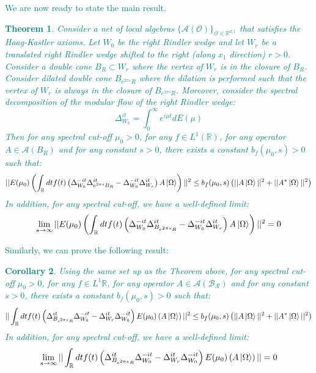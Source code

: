 \documentclass[a4paper,11pt]{article}
\newtheorem{theorem}{Theorem}
\newtheorem{corollary}[theorem]{Corollary}
\theoremstyle{definition}
\newcommand{\lb}{\left(}
\newcommand{\rb}{\right)}
\newcommand{\YC}[1]{\textcolor{teal}{#1}}
\begin{document}
\YC{
We are now ready to state the main result.
\begin{theorem}\label{theorem:mainresult}
    Consider a net of local algebras $\{\mathcal{A}(\mathcal{O})\}_{\mathcal{O}\in\mathbb{R}^{d,1}}$ that satisfies the Haag-Kastler axioms. Let $W_0$ be the right Rindler wedge and let $W_r$ be a translated right Rindler wedge shifted to the right (along $x_1$ direction) $r > 0$. Consider a double cone $B_{R}\subset W_r$ where the vertex of $W_r$ is in the closure of $B_R$. Consider dilated double cone $B_{e^{2\pi s}R}$ where the dilation is performed such that the vertex of $W_r$ is always in the closure of $B_{e^{2\pi s} R}$. Moreover, consider the spectral decomposition of the modular flow of the right Rindler wedge:
    \begin{equation}
        \Delta_{W_0}^{it} = \int_0^\infty e^{i\mu t} dE(\mu)
    \end{equation}
    Then for any spectral cut-off $\mu_0 > 0$, for any $f\in L^1(\mathbb{R})$, for any operator $A\in \mathcal{A}(B_R)$ and for any constant $s > 0$, there exists a constant $b_f(\mu_0, s) > 0$ such that:
    \begin{equation}
        ||E(\mu_0)\lb\int_\mathbb{R} dtf(t)\lb\Delta_{W_0}^{-it}\Delta_{e^{2\pi s}B_R}^{it} - \Delta_{W_0}^{-it}\Delta_{W_r}^{it}\rb A\ket{\Omega}\rb||^2 \leq b_f(\mu_0, s)\lb||A\ket{\Omega}||^2 + ||A^*\ket{\Omega}||^2\rb
    \end{equation}
    In addition, for any spectral cut-off, we have a well-defined limit:
    \begin{equation}
        \lim_{s\rightarrow \infty}||E(\mu_0)\lb\int_\mathbb{R} dt f(t)\lb\Delta_{W_0}^{-it}\Delta_{B_{e^{2\pi s}R}}^{it} - \Delta_{W_0}^{-it}\Delta_{W_r}^{it}\rb A\ket{\Omega}\rb||^2 = 0
    \end{equation}
\end{theorem}
}

\YC{
Similarly, we can prove the following result:
\begin{corollary}\label{corollary:reverseorder}
    Using the same set up as the Theorem above, for any spectral cut-off $\mu_0 > 0$, for any $f\in L^1{\mathbb{R}}$, for any operator $A\in\mathcal{A}(\mathcal{B_R})$ and for any constant $s > 0$, there exists a constant $b_f(\mu_0, s) > 0$ such that:
    \begin{equation}
        ||\int_\mathbb{R}dt f(t)\lb \Delta_{B_{e^{2\pi s}R}}^{it}\Delta_{W_0}^{-it} - \Delta_{W_r}^{it}\Delta_{W_0}^{-it}\rb E(\mu_0)\lb A\ket{\Omega}\rb||^2\leq b_f(\mu_0, s)\lb||A\ket{\Omega}||^2 + ||A^*\ket{\Omega}||^2\rb
    \end{equation}
    In addition, for any spectral cut-off, we have a well-defined limit:
    \begin{equation}
        \lim_{s\rightarrow\infty}||\int_\mathbb{R}dt f(t)\lb \Delta_{B_{e^{2\pi s}R}}^{it}\Delta_{W_0}^{-it} - \Delta_{W_r}^{it}\Delta_{W_0}^{-it}\rb E(\mu_0)\lb A\ket{\Omega}\rb|| = 0
    \end{equation}
\end{corollary}
}
\end{document}
